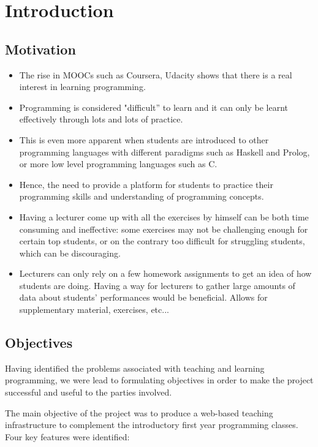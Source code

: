 \chapter{Introduction}

\section{Motivation}

\begin{itemize}
\item The rise in MOOCs such as Coursera, Udacity shows that there is a real interest in learning programming.
\item Programming is considered "difficult'' to learn and it can only be learnt effectively through lots and lots of practice.
\item This is even more apparent when students are introduced to other programming languages with different paradigms such as Haskell and Prolog, or more low level programming languages such as C.
\item Hence, the need to provide a platform for students to practice their programming skills and understanding of programming concepts.
\item Having a lecturer come up with all the exercises by himself can be both time consuming and ineffective: some exercises may not be challenging enough for certain top students, or on the contrary too difficult for struggling students, which can be discouraging.
\item Lecturers can only rely on a few homework assignments to get an idea of how students are doing. Having a way for lecturers to gather large amounts of data about students' performances would be beneficial. Allows for supplementary material, exercises, etc...
\end{itemize}

\section{Objectives}
Having identified the problems associated with teaching and learning programming, we were lead to formulating objectives in order to make the project successful and useful to the parties involved. \newline

The main objective of the project was to produce a web-based teaching infrastructure to complement the introductory first year programming classes. Four key features were identified:

